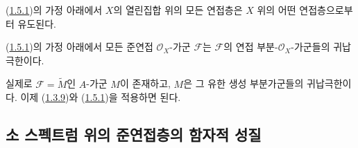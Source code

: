 \begin{corollary}[1.5.3]
\label{I.1.5.3-ko}
(\hyperref[I.1.5.1-ko]{1.5.1})의 가정 아래에서 $X$의 열린집합 위의
모든 연접층은 $X$ 위의 어떤 연접층으로부터 유도된다.
\end{corollary}

\begin{corollary}[1.5.4]
\label{I.1.5.4-ko}
(\hyperref[I.1.5.1-ko]{1.5.1})의 가정 아래에서 모든 준연접
$\mathscr{O}_X$-가군 $\mathscr{F}$는 $\mathscr{F}$의 연접
부분-$\mathscr{O}_X$-가군들의 귀납극한이다.
\end{corollary}

실제로 $\mathscr{F}=\widetilde{M}$인 $A$-가군 $M$이 존재하고,
$M$은 그 유한 생성 부분가군들의 귀납극한이다. 이제
(\hyperref[I.1.3.9-ko]{1.3.9})와
(\hyperref[I.1.5.1-ko]{1.5.1})을 적용하면 된다.

\subsection{소 스펙트럼 위의 준연접층의 함자적 성질}
\label{subsection:I.1.6-ko}

